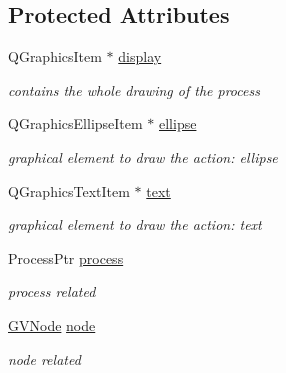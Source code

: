 \subsection*{\-Protected \-Attributes}
\begin{DoxyCompactItemize}
\item 
\hypertarget{class_g_process_afcb6a6765219d5ca69f23b89a147a7db}{\-Q\-Graphics\-Item $\ast$ \hyperlink{class_g_process_afcb6a6765219d5ca69f23b89a147a7db}{display}}\label{class_g_process_afcb6a6765219d5ca69f23b89a147a7db}

\begin{DoxyCompactList}\small\item\em contains the whole drawing of the process \end{DoxyCompactList}\item 
\hypertarget{class_g_process_ac0770d84d26f835cd409cb1bbd5a2408}{\-Q\-Graphics\-Ellipse\-Item $\ast$ \hyperlink{class_g_process_ac0770d84d26f835cd409cb1bbd5a2408}{ellipse}}\label{class_g_process_ac0770d84d26f835cd409cb1bbd5a2408}

\begin{DoxyCompactList}\small\item\em graphical element to draw the action\-: ellipse \end{DoxyCompactList}\item 
\hypertarget{class_g_process_a4ff36f4f6daae75d094c53d837ad4ecc}{\-Q\-Graphics\-Text\-Item $\ast$ \hyperlink{class_g_process_a4ff36f4f6daae75d094c53d837ad4ecc}{text}}\label{class_g_process_a4ff36f4f6daae75d094c53d837ad4ecc}

\begin{DoxyCompactList}\small\item\em graphical element to draw the action\-: text \end{DoxyCompactList}\item 
\hypertarget{class_g_process_adb2d4b43a105c00b5be1f5bc405a3f43}{\-Process\-Ptr \hyperlink{class_g_process_adb2d4b43a105c00b5be1f5bc405a3f43}{process}}\label{class_g_process_adb2d4b43a105c00b5be1f5bc405a3f43}

\begin{DoxyCompactList}\small\item\em process related \end{DoxyCompactList}\item 
\hypertarget{class_g_process_a83a9972757f06e9eff7fe120ac9f2b5b}{\hyperlink{struct_g_v_node}{\-G\-V\-Node} \hyperlink{class_g_process_a83a9972757f06e9eff7fe120ac9f2b5b}{node}}\label{class_g_process_a83a9972757f06e9eff7fe120ac9f2b5b}

\begin{DoxyCompactList}\small\item\em node related \end{DoxyCompactList}\end{DoxyCompactItemize}


